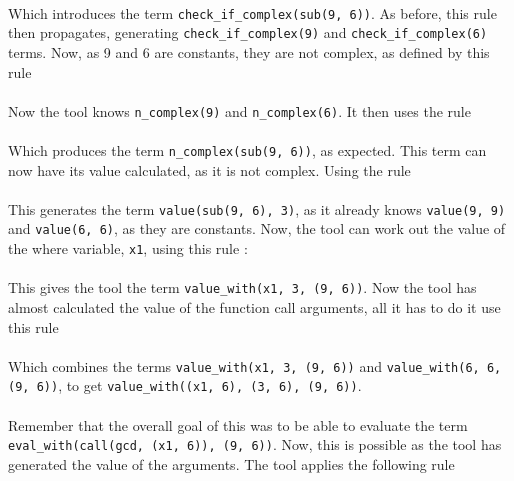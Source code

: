 
\mbox{} \\
Which introduces the term \lstinline{check_if_complex(sub(9, 6))}. As before, this rule then propagates, generating \lstinline{check_if_complex(9)} and \lstinline{check_if_complex(6)} terms. Now, as 9 and 6 are constants, they are not complex, as defined by this rule \\ %


\mbox{} \\
Now the tool knows \lstinline{n_complex(9)} and \lstinline{n_complex(6)}. It then uses the rule \\ %


\mbox{} \\
Which produces the term \lstinline{n_complex(sub(9, 6))}, as expected. This term can now have its value calculated, as it is not complex. Using the rule \\ %


\mbox{} \\
This generates the term \lstinline{value(sub(9, 6), 3)}, as it already knows \lstinline{value(9, 9)} and \lstinline{value(6, 6)}, as they are constants. Now, the tool can work out the value of the where variable, \lstinline{x1}, using this rule : \\


\mbox{} \\
This gives the tool the term \lstinline{value_with(x1, 3, (9, 6))}. Now the tool has almost calculated the value of the function call arguments, all it has to do it use this rule \\%


\mbox{} \\
Which combines the terms \lstinline{value_with(x1, 3, (9, 6))} and \lstinline{value_with(6, 6, (9, 6))}, to get \lstinline{value_with((x1, 6), (3, 6), (9, 6))}. \\ \\ %
Remember that the overall goal of this was to be able to evaluate the term \lstinline{eval_with(call(gcd, (x1, 6)), (9, 6))}. Now, this is possible as the tool has generated the value of the arguments. The tool applies the following rule \\ %

